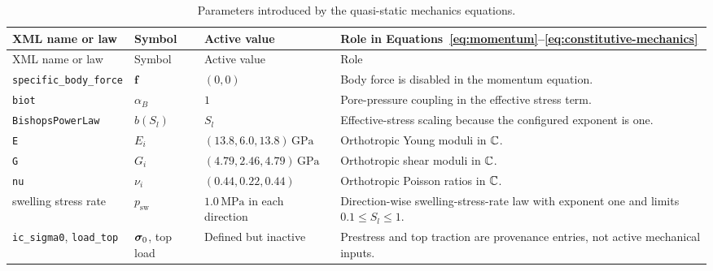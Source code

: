 \begingroup
\small
\setlength{\tabcolsep}{3pt}
\begin{longtable}{@{}L{0.20\textwidth} L{0.16\textwidth} L{0.25\textwidth} L{0.29\textwidth}@{}}
\caption{Parameters introduced by the quasi-static mechanics equations.}
\label{tab:mechanical-parameters}\\
\toprule
XML name or law & Symbol & Active value & Role in Equations~\eqref{eq:momentum}--\eqref{eq:constitutive-mechanics}\\
\midrule
\endfirsthead
\toprule
XML name or law & Symbol & Active value & Role\\
\midrule
\endhead
\bottomrule
\endlastfoot
\texttt{specific\_body\_force} & \(\bm{f}\) &
\((0,0)\) &
Body force is disabled in the momentum equation.\\
\texttt{biot} & \(\alpha_B\) &
\(1\) &
Pore-pressure coupling in the effective stress term.\\
\texttt{BishopsPowerLaw} & \(b(S_l)\) &
\(S_l\) &
Effective-stress scaling because the configured exponent is one.\\
\texttt{E} & \(E_i\) &
\((13.8,6.0,13.8)\,\mathrm{GPa}\) &
Orthotropic Young moduli in \(\mathbb{C}\).\\
\texttt{G} & \(G_i\) &
\((4.79,2.46,4.79)\,\mathrm{GPa}\) &
Orthotropic shear moduli in \(\mathbb{C}\).\\
\texttt{nu} & \(\nu_i\) &
\((0.44,0.22,0.44)\) &
Orthotropic Poisson ratios in \(\mathbb{C}\).\\
swelling stress rate & \(p_{\mathrm{sw}}\) &
\(1.0\,\mathrm{MPa}\) in each direction &
Direction-wise swelling-stress-rate law with exponent one and limits
\(0.1\le S_l\le1\).\\
\texttt{ic\_sigma0}, \texttt{load\_top} & \(\bm{\sigma}_0\), top load &
Defined but inactive &
Prestress and top traction are provenance entries, not active mechanical inputs.\\
\end{longtable}
\endgroup
